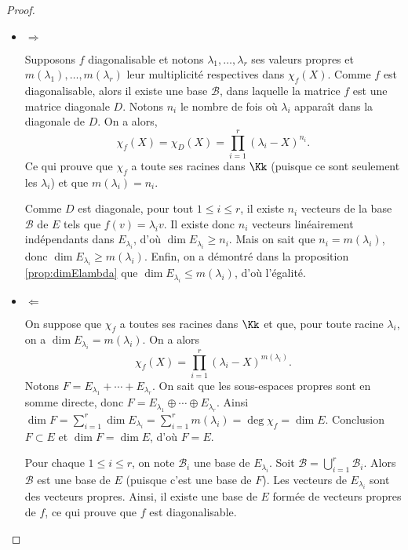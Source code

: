 \documentclass[12pt, class=report,crop=false]{standalone}
\begin{document}
\begin{proof}~
\begin{itemize}

\item $\Longrightarrow$

Supposons $f$ diagonalisable et notons $\lambda_1,\dots,\lambda_r$ ses valeurs propres et $m(\lambda_1),\ldots,m(\lambda_r)$ leur multiplicité respectives dans $\chi_f(X)$.
Comme $f$ est diagonalisable, alors il existe une base $\mathcal{B}$, 
dans laquelle la matrice  $f$ est une matrice diagonale $D$.
Notons $n_i$ le nombre de fois où $\lambda_i$ apparaît dans la diagonale de $D$.
On a alors,
$$\chi_f(X)=\chi_D(X)=\prod_{i=1}^r(\lambda_i-X)^{n_i}.$$
Ce qui prouve que $\chi_f$ a toute ses racines dans $\Kk$ (puisque ce sont seulement les $\lambda_i$)
et que $m(\lambda_i)=n_i$. 

Comme $D$ est diagonale, pour tout $1\leq i\leq r$, il existe $n_i$ vecteurs de la base $\mathcal{B}$ de $E$ 
tels que $f(v)=\lambda_i v$. Il existe donc $n_i$ vecteurs linéairement indépendants dans $E_{\lambda_i}$, d'où 
$\dim E_{\lambda_i}\ge n_i$.
Mais on sait que $n_i=m(\lambda_i)$, donc $\dim E_{\lambda_i}\ge m(\lambda_i)$.
Enfin, on a démontré dans la proposition \ref{prop:dimElambda} que $\dim E_{\lambda_i} \le m(\lambda_i)$, 
d'où l'égalité.



\item $\Longleftarrow$

On suppose que $\chi_f$ a toutes ses racines dans $\Kk$ et que, pour toute racine $\lambda_i$, on a 
$\dim E_{\lambda_i}=m(\lambda_i)$. On a alors
$$\chi_f(X)=\prod_{i=1}^r(\lambda_i-X)^{m(\lambda_i)}.$$
Notons $F=E_{\lambda_1} + \cdots +  E_{\lambda_r}$. On sait que les sous-espaces propres sont en somme directe,
donc $F=E_{\lambda_1} \oplus \cdots \oplus  E_{\lambda_r}$.
Ainsi $\dim F = \sum_{i=1}^r \dim E_{\lambda_i} = \sum_{i=1}^r m(\lambda_i) = \deg \chi_f = \dim E$.
Conclusion $F \subset E$ et $\dim F = \dim E$, d'où $F=E$.

Pour chaque $1\leq i\leq r$, on note $\mathcal{B}_i$ une base de $E_{\lambda_i}$.
Soit $\mathcal{B}=\bigcup_{i=1}^r\mathcal{B}_i$. Alors $\mathcal{B}$ est une base de $E$ (puisque c'est une base de $F$).
Les vecteurs de $E_{\lambda_i}$ sont des vecteurs propres.
Ainsi, il existe une base de $E$ formée de vecteurs propres de $f$, 
ce qui prouve que $f$ est diagonalisable. 

\end{itemize}
\end{proof}
\end{document}
